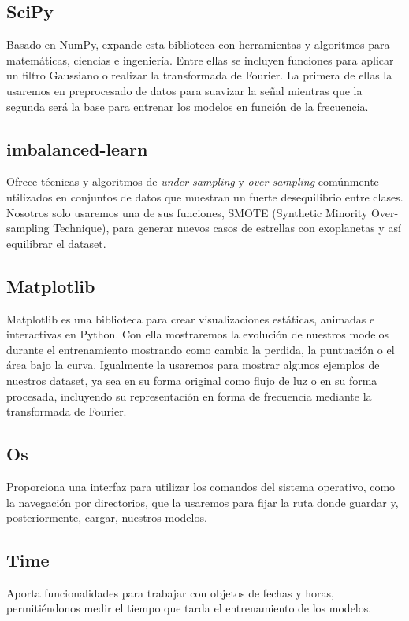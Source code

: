 \subsection{SciPy}
Basado en NumPy, expande esta biblioteca con herramientas y algoritmos para matemáticas, ciencias e ingeniería. Entre ellas se incluyen funciones para aplicar un filtro Gaussiano o realizar la transformada de Fourier. La primera de ellas la usaremos en preprocesado de datos para suavizar la señal mientras que la segunda será la base para entrenar los modelos en función de la frecuencia.

\subsection{imbalanced-learn}
Ofrece técnicas y algoritmos de \textit{under-sampling} y \textit{over-sampling} comúnmente utilizados en conjuntos de datos que muestran un fuerte desequilibrio entre clases. Nosotros solo usaremos una de sus funciones, SMOTE (Synthetic Minority Over-sampling Technique), para generar nuevos casos de estrellas con exoplanetas y así equilibrar el dataset.

\subsection{Matplotlib}
Matplotlib es una biblioteca para crear visualizaciones estáticas, animadas e interactivas en Python. Con ella mostraremos la evolución de nuestros modelos durante el entrenamiento mostrando como cambia la perdida, la puntuación o el área bajo la curva. Igualmente la usaremos para mostrar algunos ejemplos de nuestros dataset, ya sea en su forma original como flujo de luz o en su forma procesada, incluyendo su representación en forma de frecuencia mediante la transformada de Fourier.

\subsection{Os}
Proporciona una interfaz para utilizar los comandos del sistema operativo, como la navegación por directorios, que la usaremos para fijar la ruta donde guardar y, posteriormente, cargar, nuestros modelos.

\subsection{Time}
Aporta funcionalidades para trabajar con objetos de fechas y horas, permitiéndonos medir el tiempo que tarda el entrenamiento de los modelos.


